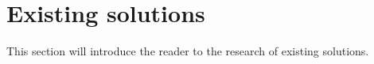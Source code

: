 
\chapter{Existing solutions}\label{ch:existing-solutions}

This section will introduce the reader to the research of existing solutions.







